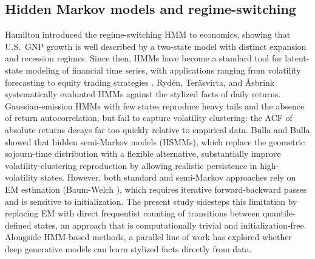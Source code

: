 \subsection{Hidden Markov models and regime-switching}
Hamilton \cite{hamilton_1989} introduced the regime-switching HMM to economics, showing that U.S.\ GNP growth is well described by a two-state model with distinct expansion and recession regimes. Since then, HMMs have become a standard tool for latent-state modeling of financial time series, with applications ranging from volatility forecasting \cite{rossi_volatility_2006} to equity trading strategies \cite{nguyen_hidden_2018}. Ryd\'{e}n, Ter\"{a}svirta, and \AA sbrink \cite{ryden_stylized_1998} systematically evaluated HMMs against the stylized facts of daily returns. Gaussian-emission HMMs with few states reproduce heavy tails and the absence of return autocorrelation, but fail to capture volatility clustering: the ACF of absolute returns decays far too quickly relative to empirical data. Bulla and Bulla \cite{bulla_stylized_2006} showed that hidden semi-Markov models (HSMMs), which replace the geometric sojourn-time distribution with a flexible alternative, substantially improve volatility-clustering reproduction by allowing realistic persistence in high-volatility states. However, both standard and semi-Markov approaches rely on EM estimation (Baum-Welch \cite{baum_1970}), which requires iterative forward-backward passes and is sensitive to initialization. The present study sidesteps this limitation by replacing EM with direct frequentist counting of transitions between quantile-defined states, an approach that is computationally trivial and initialization-free. Alongside HMM-based methods, a parallel line of work has explored whether deep generative models can learn stylized facts directly from data.

